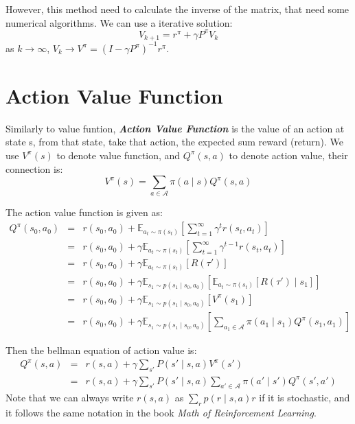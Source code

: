 \documentclass[10pt]{elegantbook}
\newcommand{\mydefination}[1]{\textbf{\textit{\textcolor{structurecolor}{#1}}}}
\begin{document}
However, this method need to calculate the inverse of the matrix, that need some numerical algorithms. We can 
use a iterative solution:
\[ V_{k+1} = r^{\pi} + \gamma P^{\pi}V_k \]
as $k \rightarrow \infty$, $V_k \rightarrow V^{\pi} = \left ( I - \gamma P^{\pi} \right )^{-1} r^{\pi}$.

\section{Action Value Function}
Similarly to value funtion, \mydefination{Action Value Function} is the value of an action at state s, 
from that state, take that action, the expected sum reward (return). We use $V^{\pi}(s)$ to denote value function, 
and $Q^{\pi}(s,a)$ to denote action value, their connection is:
\begin{equation}
    V^{\pi}(s) = \sum_{a \in \mathcal A}\pi(a\mid s) Q^{\pi}(s,a)
\end{equation} 

The action value function is given as:
\begin{equation}
    \begin{array}{lll}
    Q^{\pi}(s_0, a_0) &=& r(s_0, a_0) + \mathbb E_{a_t \sim \pi(s_t)}\left[ \sum_{t=1}^{\infty}\gamma^tr(s_t, a_t) \right] \\
                      &=& r(s_0, a_0) + \gamma \mathbb E_{a_t \sim \pi(s_t)}\left[ \sum_{t=1}^{\infty}\gamma^{t-1} r(s_t, a_t) \right] \\
                      &=& r(s_0, a_0) + \gamma \mathbb E_{a_t \sim \pi(s_t)}[R(\tau ')] \\
                      &=& r(s_0, a_0) + \gamma \mathbb E_{s_1 \sim p(s_1 \mid s_0, a_0)} \left [ \mathbb E_{a_t \sim \pi(s_t)}[R(\tau ') \mid s_1] \right ] \\
                      &=& r(s_0, a_0) + \gamma \mathbb E_{s_1 \sim p(s_1 \mid s_0, a_0)} [V^{\pi}(s_1)] \\
                      &=& r(s_0, a_0) + \gamma \mathbb E_{s_1 \sim p(s_1 \mid s_0, a_0)} \left [\sum_{a_1 \in \mathcal A}\pi(a_1 \mid s_1) Q^{\pi}(s_1, a_1) \right ]
    \end{array}
\end{equation} 

Then the bellman equation of action value is:
\begin{equation} \label{eq:bellman_equation_action}
    \begin{array}{lll}
    Q^{\pi}(s, a) &=& r(s, a) + \gamma \sum_{s'}P(s' \mid s, a)V^{\pi}(s') \\
                  &=& r(s, a) + \gamma \sum_{s'}P(s' \mid s, a)\sum_{a' \in \mathcal A}\pi(a' \mid s')Q^{\pi}(s', a')
    \end{array}
\end{equation} 
Note that we can always write $r(s, a)$ as $\sum_r p(r \mid s, a) r$ if it is stochastic, and it follows the same notation
in the book \textit{Math of Reinforcement Learning}.
\end{document}
